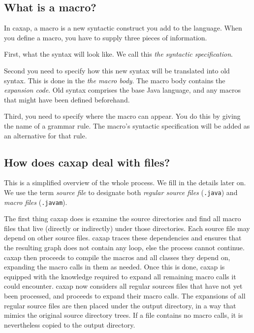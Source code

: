 \subsection{What is a macro?}

In caxap, a macro is a new syntactic construct you add to the language. When you
define a macro, you have to supply three pieces of information.

First, what the syntax will look like. We call this \emph{the syntactic
  specification}.

Second you need to specify how this new syntax will be translated into old
syntax. This is done in the \emph{the macro body}. The macro body contains the
\emph{expansion code}. Old syntax comprises the base Java language, and any
macros that might have been defined beforehand.

Third, you need to specify where the macro can appear. You do this by giving the
name of a grammar rule. The macro's syntactic specification will be added as an
alternative for that rule.

\subsection{How does caxap deal with files?}

This is a simplified overview of the whole process. We fill in the details later
on. We use the term \emph{source file} to designate both \emph{regular source
  files} (\texttt{.java}) and \emph{macro files} (\texttt{.javam}).

The first thing caxap does is examine the source directories and find all macro
files that live (directly or indirectly) under those directories. Each source
file may depend on other source files. caxap traces these dependencies and
ensures that the resulting graph does not contain any loop, else the process
cannot continue. caxap then proceeds to compile the macros and all classes they
depend on, expanding the macro calls in them as needed. Once this is done, caxap
is equipped with the knowledge required to expand all remaining macro calls it
could encounter. caxap now considers all regular sources files that have not yet
been processed, and proceeds to expand their macro calls. The expansions of all
regular source files are then placed under the output directory, in a way that
mimics the original source directory trees. If a file contains no macro calls,
it is nevertheless copied to the output directory.

